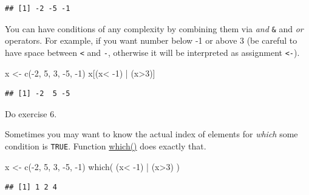 \documentclass[
]{book}
\newenvironment{Shaded}{\begin{snugshade}}{\end{snugshade}}
\newcommand{\DecValTok}[1]{\textcolor[rgb]{0.00,0.00,0.81}{#1}}
\newcommand{\FunctionTok}[1]{\textcolor[rgb]{0.00,0.00,0.00}{#1}}
\newcommand{\NormalTok}[1]{#1}
\newcommand{\OtherTok}[1]{\textcolor[rgb]{0.56,0.35,0.01}{#1}}
\newcommand{\SpecialCharTok}[1]{\textcolor[rgb]{0.00,0.00,0.00}{#1}}
\begin{document}
\begin{verbatim}
## [1] -2 -5 -1
\end{verbatim}

You can have conditions of any complexity by combining them via \emph{and} \texttt{\&} and \emph{or} \texttt{\textbar{}} operators. For example, if you want number below -1 or above 3 (be careful to have space between \texttt{\textless{}} and \texttt{-}, otherwise it will be interpreted as assignment \texttt{\textless{}-}).

\begin{Shaded}
\begin{Highlighting}[]
\NormalTok{x }\OtherTok{\textless{}{-}} \FunctionTok{c}\NormalTok{(}\SpecialCharTok{{-}}\DecValTok{2}\NormalTok{, }\DecValTok{5}\NormalTok{, }\DecValTok{3}\NormalTok{, }\SpecialCharTok{{-}}\DecValTok{5}\NormalTok{, }\SpecialCharTok{{-}}\DecValTok{1}\NormalTok{)}
\NormalTok{x[(x}\SpecialCharTok{\textless{}} \SpecialCharTok{{-}}\DecValTok{1}\NormalTok{) }\SpecialCharTok{|}\NormalTok{ (x}\SpecialCharTok{\textgreater{}}\DecValTok{3}\NormalTok{)]}
\end{Highlighting}
\end{Shaded}

\begin{verbatim}
## [1] -2  5 -5
\end{verbatim}

Do exercise 6.

Sometimes you may want to know the actual index of elements for \emph{which} some condition is \texttt{TRUE}. Function \href{https://stat.ethz.ch/R-manual/R-devel/library/base/html/which.html}{which()} does exactly that.

\begin{Shaded}
\begin{Highlighting}[]
\NormalTok{x }\OtherTok{\textless{}{-}} \FunctionTok{c}\NormalTok{(}\SpecialCharTok{{-}}\DecValTok{2}\NormalTok{, }\DecValTok{5}\NormalTok{, }\DecValTok{3}\NormalTok{, }\SpecialCharTok{{-}}\DecValTok{5}\NormalTok{, }\SpecialCharTok{{-}}\DecValTok{1}\NormalTok{)}
\FunctionTok{which}\NormalTok{( (x}\SpecialCharTok{\textless{}} \SpecialCharTok{{-}}\DecValTok{1}\NormalTok{) }\SpecialCharTok{|}\NormalTok{ (x}\SpecialCharTok{\textgreater{}}\DecValTok{3}\NormalTok{) )}
\end{Highlighting}
\end{Shaded}

\begin{verbatim}
## [1] 1 2 4
\end{verbatim}
\end{document}
